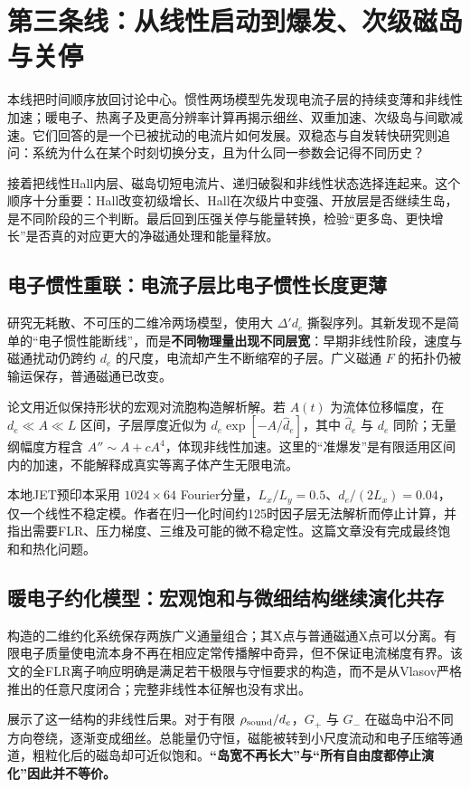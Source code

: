 \section{第三条线：从线性启动到爆发、次级磁岛与关停}\label{story:onset}
本线把时间顺序放回讨论中心。惯性两场模型先发现电流子层的持续变薄和非线性加速；暖电子、热离子及更高分辨率计算再揭示细丝、双重加速、次级岛与间歇减速。它们回答的是一个已被扰动的电流片如何发展。双稳态与自发转快研究则追问：系统为什么在某个时刻切换分支，且为什么同一参数会记得不同历史？

接着把线性Hall内层、磁岛切短电流片、递归破裂和非线性状态选择连起来。这个顺序十分重要：Hall改变初级增长、Hall在次级片中变强、开放层是否继续生岛，是不同阶段的三个判断。最后回到压强关停与能量转换，检验“更多岛、更快增长”是否真的对应更大的净磁通处理和能量释放。

\subsection{电子惯性重联：电流子层比电子惯性长度更薄}
\citet{Ottaviani1993}研究无耗散、不可压的二维冷两场模型，使用大 $\Delta'd_e$ 撕裂序列。其新发现不是简单的“电子惯性能断线”，而是\textbf{不同物理量出现不同层宽}：早期非线性阶段，速度与磁通扰动仍跨约 $d_e$ 的尺度，电流却产生不断缩窄的子层。广义磁通 $F$ 的拓扑仍被输运保存，普通磁通已改变。

论文用近似保持形状的宏观对流胞构造解析解。若 $A(t)$ 为流体位移幅度，在 $d_e\ll A\ll L$ 区间，子层厚度近似为 $d_e\exp[-A/\widehat d_e]$，其中 $\widehat d_e$ 与 $d_e$ 同阶；无量纲幅度方程含 $A''\sim A+cA^4$，体现非线性加速。这里的“准爆发”是有限适用区间内的加速，不能解释成真实等离子体产生无限电流。

本地JET预印本采用 $1024\times64$ Fourier分量，$L_x/L_y=0.5$、$d_e/(2L_x)=0.04$，仅一个线性不稳定模。作者在归一化时间约125时因子层无法解析而停止计算，并指出需要FLR、压力梯度、三维及可能的微不稳定性。这篇文章没有完成最终饱和和热化问题。

\subsection{暖电子约化模型：宏观饱和与微细结构继续演化共存}
\citet{Schep1994}构造的二维约化系统保存两族广义通量组合；其X点与普通磁通X点可以分离。有限电子质量使电流本身不再在相应定常传播解中奇异，但不保证电流梯度有界。该文的全FLR离子响应明确是满足若干极限与守恒要求的构造，而不是从Vlasov严格推出的任意尺度闭合；完整非线性本征解也没有求出。

\citet{L049}展示了这一结构的非线性后果。对于有限 $\rho_{\rm sound}/d_e$，$G_+$ 与 $G_-$ 在磁岛中沿不同方向卷绕，逐渐变成细丝。总能量仍守恒，磁能被转到小尺度流动和电子压缩等通道，粗粒化后的磁岛却可近似饱和。\textbf{“岛宽不再长大”与“所有自由度都停止演化”因此并不等价。}

